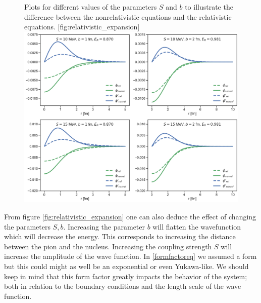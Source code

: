 \begin{figure}[H]
    \begin{sidecaption}{Plots for different values of the parameters $S$ and $b$ to illustrate the difference between the nonrelativistic equations and the relativistic equations. }[fig:relativistic_expansion]
    \includegraphics[width=\linewidth]{Figures/RelativisticExpansion.pdf}
    \end{sidecaption}
\end{figure}
From figure \ref{fig:relativistic_expansion} one can also deduce the effect of changing the parameters $S,b$. Increasing the parameter $b$ will flatten the wavefunction which will decrease the energy. This corresponds to increasing the distance between the pion and the nucleus. Increasing the coupling strength $S$ will increase the amplitude of the wave function. In \eqref{formfactoreq} we assumed a form but this could might as well be an exponential or even Yukawa-like. We should keep in mind that this form factor greatly impacts the behavior of the system; both in relation to the boundary conditions and the length scale of the wave function. 


